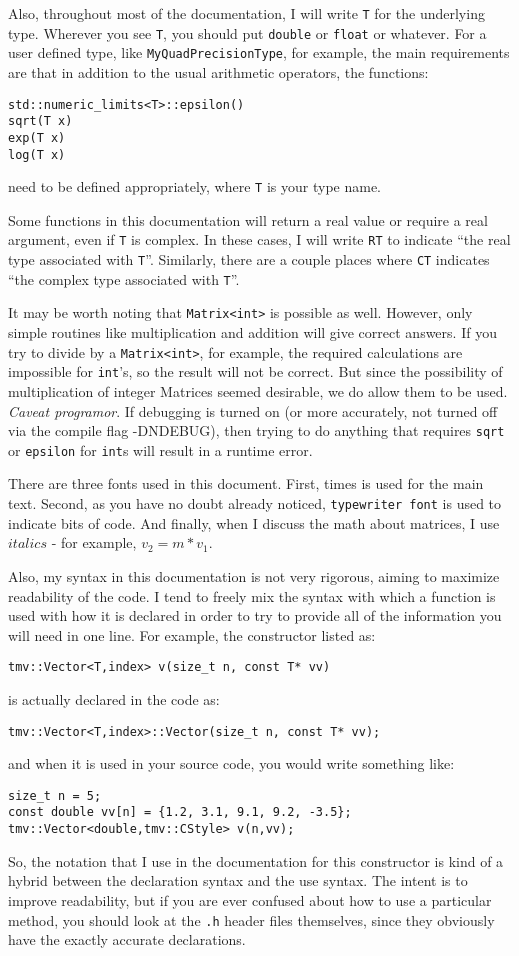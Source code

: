 \documentclass[twoside,letterpaper,11pt]{article}
\renewcommand{\tt}[1]{{\texttt {#1}}}
\begin{document}
Also, throughout most of the documentation, I will write \tt{T} for the underlying type.
Wherever you see \tt{T}, you should put \tt{double} or \tt{float} or whatever.
For a user defined type, like \tt{MyQuadPrecisionType}, for example, the main requirements are that 
in addition to the usual arithmetic operators, the functions:
\begin{verbatim}
std::numeric_limits<T>::epsilon()
sqrt(T x) 
exp(T x) 
log(T x)
\end{verbatim}
need to be defined appropriately, where \tt{T} is your type name.  

Some functions in this documentation will return a real value or require a real argument, 
even if \tt{T} is complex.  In these cases, I will write \tt{RT} to indicate 
``the real type associated with \tt{T}''.  Similarly, there are a couple places where \tt{CT}
indicates ``the complex type associated with \tt{T}''.

It may be worth noting that \tt{Matrix<int>} is possible as well.  
However, only simple 
routines like multiplication and addition will give correct answers.  If you try to 
divide by a \tt{Matrix<int>}, for example, the required calculations are impossible 
for \tt{int}'s,
so the result will not be correct.  But since the possibility of multiplication of 
integer Matrices seemed desirable, we do allow them to be used.  
\emph{Caveat programor}.  If debugging is turned on (or more accurately, not
turned off via the compile flag -DNDEBUG), then trying to do anything that requires
\tt{sqrt} or \tt{epsilon} for \tt{int}s will result in a runtime error.

There are three fonts used in this document.  First, times is used for the main text.  
Second, as you have no doubt already noticed, \tt{typewriter font} is used to 
indicate bits of code.  And finally, when I discuss the math about matrices, I 
use $italics$ - for example, $v_2 = m * v_1$.

Also, my syntax in this documentation is not very rigorous, aiming to maximize
readability of the code.  
I tend to freely mix the syntax with which a function is used with how
it is declared in order to try to provide all of the information you will need in one line.  
For example, the constructor listed as:
\begin{verbatim}
tmv::Vector<T,index> v(size_t n, const T* vv)
\end{verbatim}
is actually declared in the code as:
\begin{verbatim}
tmv::Vector<T,index>::Vector(size_t n, const T* vv);
\end{verbatim}
and when it is used in your source code, you would write something like:
\begin{verbatim}
size_t n = 5;
const double vv[n] = {1.2, 3.1, 9.1, 9.2, -3.5};
tmv::Vector<double,tmv::CStyle> v(n,vv);
\end{verbatim}
So, the notation that I use in the documentation for this constructor is kind of a hybrid between the declaration syntax and the use syntax.  The intent is to improve readability, but
if you are ever confused about how to use a particular method, you should look at
the \tt{.h} header files themselves, since they obviously have the exactly accurate
declarations.  
\end{document}
